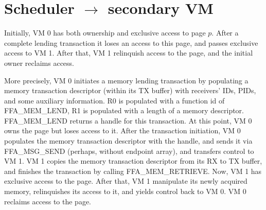 \documentclass{article}
\begin{document}
\section{Scheduler $\rightarrow$ secondary VM}

Initially, VM 0 has both ownership and exclusive access to page $p$. After a complete lending transaction it loses an access to this page, and passes exclusive access to VM 1. After that, VM 1 relinquish access to the page, and the initial owner reclaims access.

More precisely, VM 0 initiates a memory lending transaction by populating a memory transaction descriptor (within its TX buffer) with receivers' IDs, PIDs, and some auxiliary information. R0 is populated with a function id of FFA\_MEM\_LEND, R1 is populated with a length of a memory descriptor. FFA\_MEM\_LEND returns a handle for this transaction. At this point, VM 0 owns the page but loses access to it. After the transaction initiation, VM 0 populates the memory transaction descriptor with the handle, and sends it via FFA\_MSG\_SEND (perhaps, without endpoint array), and transfers control to VM 1. VM 1 copies the memory transaction descriptor from its RX to TX buffer, and finishes the transaction by calling FFA\_MEM\_RETRIEVE. Now, VM 1 has exclusive access to the page. After that, VM 1 manipulate its newly acquired memory, relinquishes its access to it, and yields control back to VM 0. VM 0 reclaims access to the page.
\end{document}
